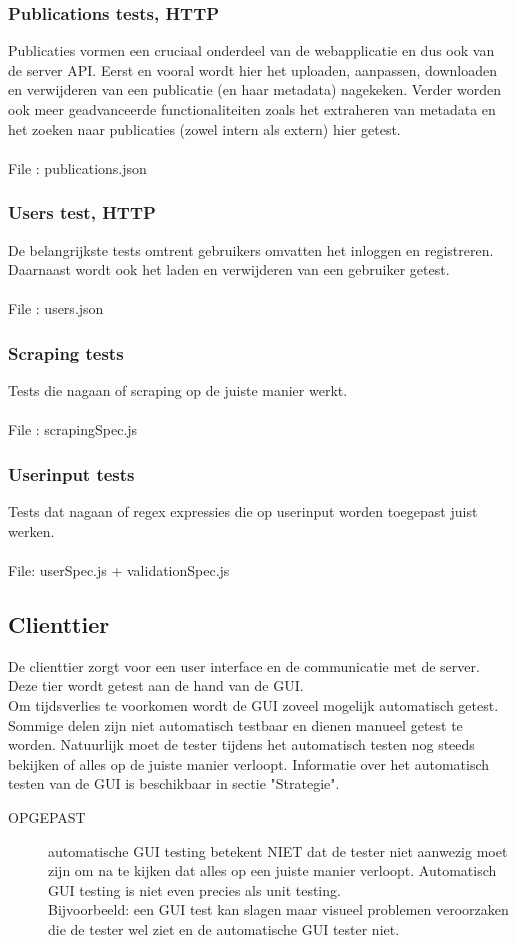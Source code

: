 \documentclass{article}
\begin{document}
\subsubsection{Publications tests, HTTP}
Publicaties vormen een cruciaal onderdeel van de webapplicatie en dus ook van de server API. Eerst en vooral wordt hier het uploaden, aanpassen, downloaden en verwijderen van een publicatie (en haar metadata) nagekeken. Verder worden ook meer geadvanceerde functionaliteiten zoals het extraheren van metadata en het zoeken naar publicaties (zowel intern als extern) hier getest.\\\\
File : publications.json
\subsubsection{Users test, HTTP}
De belangrijkste tests omtrent gebruikers omvatten het inloggen en registreren.
Daarnaast wordt ook het laden en verwijderen van een gebruiker getest.\\\\
File : users.json
\subsubsection{Scraping tests}
Tests die nagaan of scraping op de juiste manier werkt.\\\\
File : scrapingSpec.js
\subsubsection{Userinput tests}
Tests dat nagaan of regex expressies die op userinput worden toegepast juist werken. \\\\
File: userSpec.js + validationSpec.js
\subsection{Clienttier}
De clienttier zorgt voor een user interface en de communicatie met de server. Deze tier wordt getest aan de hand van de GUI.\\
Om tijdsverlies te voorkomen wordt de GUI zoveel mogelijk automatisch getest. Sommige delen zijn niet automatisch testbaar en dienen manueel getest te worden. Natuurlijk moet de tester tijdens het automatisch testen nog steeds bekijken of alles op de juiste manier verloopt. Informatie over het automatisch testen van de GUI is beschikbaar in sectie "Strategie".\\
\begin{description}
\item[OPGEPAST] automatische GUI testing betekent NIET dat de tester niet aanwezig moet zijn om na te kijken dat alles op een juiste manier verloopt. Automatisch GUI testing is niet even precies als unit testing.\\
Bijvoorbeeld: een GUI test kan slagen maar visueel problemen veroorzaken die de tester wel ziet en de automatische GUI tester niet.
\end{description}
\end{document}
